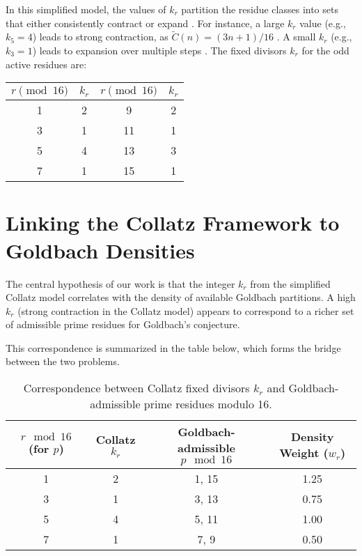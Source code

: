 \documentclass[12pt]{article}
\begin{document}
	In this simplified model, the values of $k_r$ partition the residue classes into sets that either consistently contract or expand . For instance, a large $k_r$ value (e.g., $k_5 = 4$) leads to strong contraction, as $\tilde{C}(n) = (3n+1)/16$ . A small $k_r$ (e.g., $k_3 = 1$) leads to expansion over multiple steps . The fixed divisors $k_r$ for the odd active residues are:
	\begin{center}
		\begin{tabular}{c|c||c|c}
			\toprule
			\( r \pmod{16} \) & \( k_r \) & \( r \pmod{16} \) & \( k_r \) \\ \midrule
			1 & 2 & 9 & 2 \\
			3 & 1 & 11 & 1 \\
			5 & 4 & 13 & 3 \\
			7 & 1 & 15 & 1 \\
			\bottomrule
		\end{tabular}
	\end{center}
	
	\section{Linking the Collatz Framework to Goldbach Densities}
	
	The central hypothesis of our work is that the integer $k_r$ from the simplified Collatz model correlates with the density of available Goldbach partitions. A high $k_r$ (strong contraction in the Collatz model) appears to correspond to a richer set of admissible prime residues for Goldbach's conjecture.
 
	\vspace{1em}
	
	This correspondence is summarized in the table below, which forms the bridge between the two problems.
	
	\begin{table}[h!]
		\centering
		\caption{Correspondence between Collatz fixed divisors $k_r$ and Goldbach-admissible prime residues modulo 16.}
		\label{tab:collatz-goldbach}
		\begin{tabular}{cccc}
			\toprule
			\( r \mod 16 \) (for $p$) & Collatz \(k_r\) & Goldbach-admissible \(p \mod 16\) & Density Weight ($w_r$) \\
			\midrule
			1 & 2 & 1, 15 & 1.25 \\
			3 & 1 & 3, 13 & 0.75 \\
			5 & 4 & 5, 11 & 1.00 \\
			7 & 1 & 7, 9 & 0.50 \\
			\bottomrule
		\end{tabular}
	\end{table}
	
\end{document}
